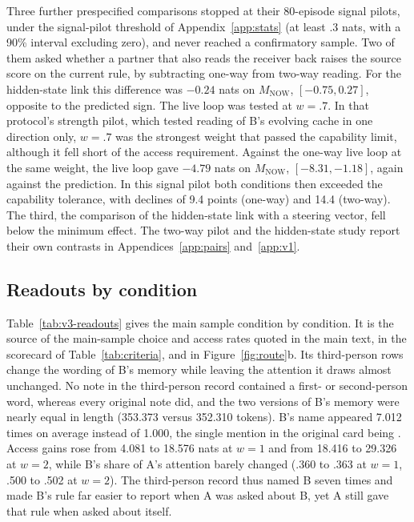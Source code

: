 Three further prespecified comparisons stopped at their 80-episode signal
pilots, under the signal-pilot threshold of Appendix~\ref{app:stats}
(at least .3 nats, with a 90\% interval excluding zero), and never
reached a confirmatory sample. Two of them asked whether a partner that
also reads the receiver back raises the source score on the current
rule, by subtracting one-way from two-way reading. For the
hidden-state link this difference was $-0.24$ nats on
$M_{\mathrm{NOW}}$, $[-0.75,0.27]$, opposite to the predicted sign. The
live loop was tested at $w=.7$. In that protocol's strength pilot, which
tested reading of B's evolving cache in one direction only, $w=.7$ was
the strongest weight that passed the capability limit, although it fell
short of the access requirement. Against the one-way live loop at the
same weight, the live loop gave $-4.79$ nats on $M_{\mathrm{NOW}}$,
$[-8.31,-1.18]$, again against the prediction. In
this signal pilot both conditions then exceeded the capability
tolerance, with declines of 9.4 points (one-way) and 14.4 (two-way).
The third, the comparison of the hidden-state link with a steering
vector, fell below the minimum effect. The two-way pilot and the
hidden-state study report their own contrasts in
Appendices~\ref{app:pairs} and~\ref{app:v1}.

\subsection{Readouts by condition}

Table~\ref{tab:v3-readouts} gives the main sample condition by
condition. It is the source of the main-sample choice and access rates
quoted in the main text, in the scorecard of Table~\ref{tab:criteria},
and in Figure~\ref{fig:route}b. Its third-person rows change the wording of
B's memory while leaving the attention it draws almost unchanged. No
note in the third-person record contained a first- or second-person
word, whereas every original note did, and the two versions of B's
memory were nearly equal in length (353.373 versus 352.310 tokens). B's name appeared 7.012 times on
average instead of 1.000, the single mention in the original card being
. Access gains rose from 4.081 to 18.576
nats at $w=1$ and from 18.416 to 29.326 at $w=2$, while B's share of A's
attention barely changed (.360 to .363 at $w=1$, .500 to .502 at $w=2$).
The third-person record thus named B seven times and made B's rule far
easier to report when A was asked about B, yet A still gave that
rule when asked about itself.

